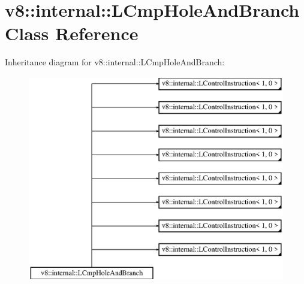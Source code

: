 \hypertarget{classv8_1_1internal_1_1_l_cmp_hole_and_branch}{}\section{v8\+:\+:internal\+:\+:L\+Cmp\+Hole\+And\+Branch Class Reference}
\label{classv8_1_1internal_1_1_l_cmp_hole_and_branch}
Inheritance diagram for v8\+:\+:internal\+:\+:L\+Cmp\+Hole\+And\+Branch\+:\begin{figure}[H]
\begin{center}
\leavevmode
\includegraphics[height=9.000000cm]{classv8_1_1internal_1_1_l_cmp_hole_and_branch}
\end{center}
\end{figure}
